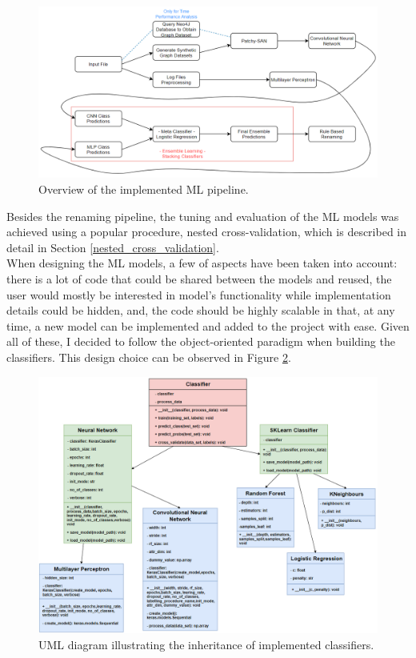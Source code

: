 \begin{figure}[H]
  \centering
  \centerline{\includegraphics[scale = 0.5]{Images/pipeline.png}}
  \caption{Overview of the implemented ML pipeline.}
  \label{pipeline}
\end{figure}

Besides the renaming pipeline, the tuning and evaluation of the ML models was achieved using a popular procedure, nested cross-validation, which is described in detail in Section \ref{nested_cross_validation}. \\

When designing the ML models, a few of aspects have been taken into account: there is a lot of code that could be shared between the models and reused, the user would mostly be interested in model's functionality while implementation details could be hidden, and, the code should be highly scalable in that, at any time, a new model can be implemented and added to the project with ease. Given all of these, I decided to follow the object-oriented paradigm when building the classifiers. This design choice can be observed in Figure \ref{uml_oop}.

\begin{figure}[H]
  \centering
  \centerline{\includegraphics[scale = 0.6]{Images/uml.png}}
  \caption{UML diagram illustrating the inheritance of implemented classifiers.}
  \label{uml_oop}
\end{figure}

